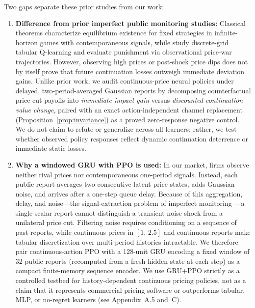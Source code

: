 Two gaps separate these prior studies from our work:
\begin{enumerate}
\item \textbf{Difference from prior imperfect public monitoring studies:} Classical theorems \citep{green1984noncooperative, abreu1990toward, fudenberg1994folk} characterize equilibrium existence for fixed strategies in infinite-horizon games with contemporaneous signals, while \citet{calvano2021algorithmic} study discrete-grid tabular Q-learning and evaluate punishment via observational price-war trajectories. However, observing high prices or post-shock price dips does not by itself prove that future continuation losses outweigh immediate deviation gains. Unlike prior work, we audit continuous-price neural policies under delayed, two-period-averaged Gaussian reports by decomposing counterfactual price-cut payoffs into \emph{immediate impact gain} versus \emph{discounted continuation value change}, paired with an exact action-independent channel replacement (Proposition~\ref{prop:invariance}) as a proved zero-response negative control. We do not claim to refute \citet{calvano2021algorithmic} or generalize across all learners; rather, we test whether observed policy responses reflect dynamic continuation deterrence or immediate static losses.
\item \textbf{Why a windowed GRU with PPO is used:} In our market, firms observe neither rival prices nor contemporaneous one-period signals. Instead, each public report averages two consecutive latent price states, adds Gaussian noise, and arrives after a one-step queue delay. Because of this aggregation, delay, and noise---the signal-extraction problem of imperfect monitoring \citep{green1984noncooperative, calvano2021algorithmic}---a single scalar report cannot distinguish a transient noise shock from a unilateral price cut. Filtering noise requires conditioning on a sequence of past reports, while continuous prices in $[1,\,2.5]$ and continuous reports make tabular discretization over multi-period histories intractable. We therefore pair continuous-action PPO \citep{schulman2017proximal} with a 128-unit GRU encoding a fixed window of 32 public reports (recomputed from a fresh hidden state at each step) as a compact finite-memory sequence encoder. We use GRU+PPO strictly as a controlled testbed for history-dependent continuous pricing policies, not as a claim that it represents commercial pricing software or outperforms tabular, MLP, or no-regret learners (see Appendix~A.5 and~C).
\end{enumerate}

